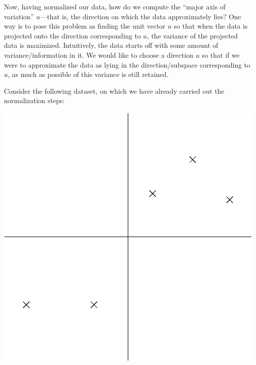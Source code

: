 \documentclass{article}
\begin{document}
Now, having normalized our data, how do we compute the ``major axis of variation'' $u$---that is, the direction on which the data approximately lies? One way is to pose this problem as finding the unit vector $u$ so that when the data is projected onto the direction corresponding to $u$, the variance of the projected data is maximized. Intuitively, the data starts off with some amount of variance/information in it. We would like to choose a direction $u$ so that if we were to approximate the data as lying in the direction/subspace corresponding to $u$, as much as possible of this variance is still retained.

Consider the following dataset, on which we have already carried out the normalization steps:
\begin{center}
\includegraphics[scale=0.5]{rawdata.eps}
\end{center}
\end{document}
